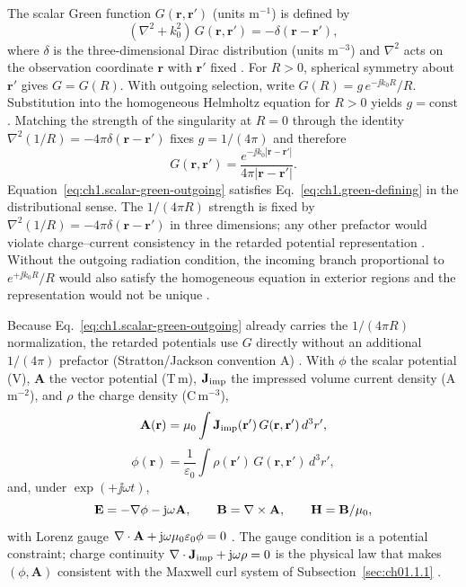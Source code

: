 The scalar Green function $G(\mathbf{r},\mathbf{r}')$ (units m\(^{-1}\)) is defined by
\begin{equation}
\label{eq:ch1.green-defining}
(\nabla^2+k_0^2)\,G(\mathbf{r},\mathbf{r}')=-\delta(\mathbf{r}-\mathbf{r}'),
\end{equation}
where $\delta$ is the three-dimensional Dirac distribution (units m\(^{-3}\)) and $\nabla^2$ acts on the observation coordinate $\mathbf{r}$ with $\mathbf{r}'$ fixed \cite{stratton1941,jackson1999}. For $R>0$, spherical symmetry about $\mathbf{r}'$ gives $G=G(R)$. With outgoing selection, write $G(R)=g\,e^{-\jj k_0 R}/R$. Substitution into the homogeneous Helmholtz equation for $R>0$ yields $g=\mathrm{const}$. Matching the strength of the singularity at $R=0$ through the identity $\nabla^2(1/R)=-4\pi\delta(\mathbf{r}-\mathbf{r}')$ fixes $g=1/(4\pi)$ and therefore
\begin{equation}
\label{eq:ch1.scalar-green-outgoing}
G(\mathbf{r},\mathbf{r}')
=
\frac{e^{-\jj k_0|\mathbf{r}-\mathbf{r}'|}}{4\pi|\mathbf{r}-\mathbf{r}'|}.
\end{equation}
Equation~\eqref{eq:ch1.scalar-green-outgoing} satisfies Eq.~\eqref{eq:ch1.green-defining} in the distributional sense. The $1/(4\pi R)$ strength is fixed by $\nabla^2(1/R)=-4\pi\delta(\mathbf{r}-\mathbf{r}')$ in three dimensions; any other prefactor would violate charge--current consistency in the retarded potential representation \cite{jackson1999,stratton1941}. Without the outgoing radiation condition, the incoming branch proportional to $e^{+\jj k_0 R}/R$ would also satisfy the homogeneous equation in exterior regions and the representation would not be unique \cite{stratton1941,jackson1999}.

Because Eq.~\eqref{eq:ch1.scalar-green-outgoing} already carries the $1/(4\pi R)$ normalization, the retarded potentials use $G$ directly without an additional $1/(4\pi)$ prefactor (Stratton/Jackson convention A) \cite{stratton1941,jackson1999}. With $\phi$ the scalar potential (V), $\mathbf{A}$ the vector potential (T\,m), $\mathbf{J}_{\mathrm{imp}}$ the impressed volume current density (A\,m$^{-2}$), and $\rho$ the charge density (C\,m$^{-3}$),
\begin{equation}
\label{eq:ch1.vector-potential-retarded}
\mathbf{A}(\mathbf{r})
=
\mu_0\int
\mathbf{J}_{\mathrm{imp}}(\mathbf{r}')\,
G(\mathbf{r},\mathbf{r}')\,
d^3r',
\end{equation}
\begin{equation}
\label{eq:ch1.lorenz-scalar-potential-retarded}
\phi(\mathbf{r})
=
\frac{1}{\varepsilon_0}\int
\rho(\mathbf{r}')\,
G(\mathbf{r},\mathbf{r}')\,
d^3r',
\end{equation}
and, under $\exp(+\jj\omega t)$,
\begin{equation}
\label{eq:ch1.lorenz-field-reconstruction}
\mathbf{E}=-\nabla\phi-\mathrm{j}\omega\mathbf{A},\qquad \mathbf{B}=\nabla\times\mathbf{A},\qquad \mathbf{H}=\mathbf{B}/\mu_0,
\end{equation}
with Lorenz gauge $\nabla\cdot\mathbf{A}+\mathrm{j}\omega\mu_0\varepsilon_0\phi=0$ \cite{stratton1941,jackson1999}. The gauge condition is a potential constraint; charge continuity $\nabla\cdot\mathbf{J}_{\mathrm{imp}}+\mathrm{j}\omega\rho=0$ is the physical law that makes $(\phi,\mathbf{A})$ consistent with the Maxwell curl system of Subsection~\ref{sec:ch01.1.1} \cite{maxwell1873,stratton1941}.

